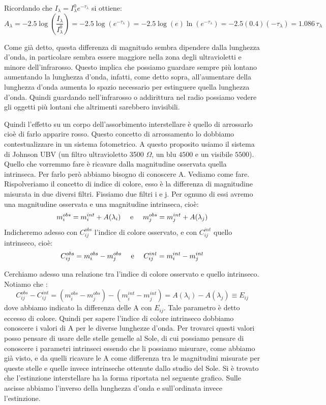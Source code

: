 \documentclass[a4paper,11pt]{article}
\begin{document}
    Ricordando che $ I_{\lambda} = I_{\lambda}^0 e^{-\tau_{\lambda}}$ si ottiene:
    $$
    A_{\lambda} = 
    -2.5 \log \left(\frac{I_{\lambda}}{I_{\lambda}^0 } \right)=
    -2.5 \log \left( e^{-\tau_{\lambda}} \right) = 
    -2.5 \log(e) \ln ( e^{-\tau_{\lambda}} ) =
    -2.5 (0.4) (-\tau_{\lambda} ) = 1.086 \, \tau_{\lambda}
    $$
    
    Come già detto, questa differenza di magnitudo sembra dipendere dalla lunghezza d'onda, in particolare sembra essere maggiore nella zona degli ultravioletti e minore dell'infrarosso. Questo implica che possiamo guardare sempre più lontano aumentando la lunghezza d'onda, infatti, come detto sopra, all'aumentare della lunghezza d'onda aumenta lo spazio necessario per estinguere quella lunghezza d'onda. Quindi guardando nell'infrarosso o addirittura nel radio possiamo vedere gli oggetti più lontani che altrimenti sarebbero invisibili.
    
    Quindi l'effetto su un corpo dell'assorbimento interstellare è quello di arrossarlo cioè di farlo apparire rosso. Questo concetto di arrossamento lo dobbiamo contestualizzare in un sistema fotometrico. A questo proposito usiamo il sistema di Johnson UBV (un filtro ultravioletto 3500 $\Omega$, un blu $4500$ e un visibile $5500$). Quello che vorremmo fare è ricavare dalla magnitudine osservata quella intrinseca. Per farlo però abbiamo bisogno di conoscere A. Vediamo come fare. Rispolveriamo il concetto di indice di colore, esso è la differenza di magnitudine misurata in due diversi filtri.
    Fissiamo due filtri i e j. Per ognuno di essi avremo una magnitudine osservata e una magnitudine intrinseca, cioè:
    $$
        m_i^{obs} = m_i^{int} + A(\lambda_i) \quad\hbox{ e } \quad m_j^{obs} = m_j^{int} + A(\lambda_j)
    $$
    Indicheremo adesso con $C_{ij}^{obs}$ l'indice di colore osservato, e con $C_{ij}^{int}$ quello intrinseco, cioè:
    $$
        C_{ij}^{obs} = m_i^{obs} - m_j^{obs} \quad\hbox{ e } \quad C_{ij}^{int} = m_i^{int} - m_j^{int}
    $$
    
    Cerchiamo adesso una relazione tra l'indice di colore osservato e quello intrinseco. Notiamo che :
    $$
        C_{ij}^{obs} - C_{ij}^{int} = ( m_i^{obs} - m_j^{obs}) - ( m_i^{int} - m_j^{int} ) = A(\lambda_i) - A(\lambda_j) \equiv E_{ij}
    $$
    dove abbiamo indicato la differenza delle A con $E_{ij}$. Tale parametro è detto eccesso di colore. Quindi per sapere l'indice di colore intrinseco dobbiamo conoscere i valori di A per le diverse lunghezze d'onda. Per trovarci questi valori posso pensare di usare delle stelle gemelle al Sole, di cui possiamo pensare di conoscere i parametri intrinseci essendo che li possiamo misurare, come abbiamo già visto, e da quelli ricavare le A come differenza tra le magnitudini misurate per queste stelle e quelle invece intrinseche ottenute dallo studio del Sole. Si è trovato che l'estinzione interstellare ha la forma riportata nel seguente grafico. Sulle ascisse abbiamo l'inverso della lunghezza d'onda e sull'ordinata invece l'estinzione.
    
\end{document}
